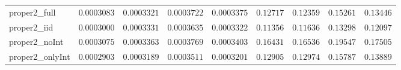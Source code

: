 \begin{table}
\begin{tabular}{lcccccccc}
proper2_full  & $0.0003083$ & $0.0003321$ & $0.0003722$ & $0.0003375$ & $0.12717$ & $0.12359$ & $0.15261$ & $0.13446$ \\
proper2_iid  & $0.0003000$ & $0.0003331$ & $0.0003635$ & $0.0003322$ & $0.11356$ & $0.11636$ & $0.13298$ & $0.12097$ \\
proper2_noInt  & $0.0003075$ & $0.0003363$ & $0.0003769$ & $0.0003403$ & $0.16431$ & $0.16536$ & $0.19547$ & $0.17505$ \\
proper2_onlyInt  & $0.0002903$ & $0.0003189$ & $0.0003511$ & $0.0003201$ & $0.12905$ & $0.12974$ & $0.15787$ & $0.13889$ \\
\hline 
\end{tabular}


\end{table}